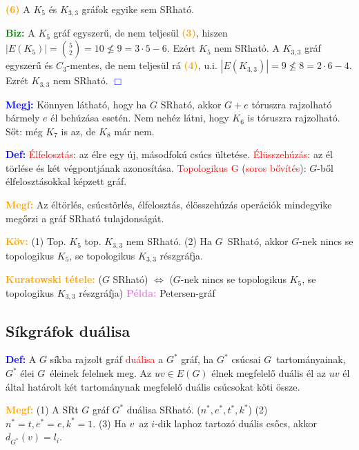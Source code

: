 \documentclass[../szamtud.tex]{subfiles}
\begin{document}
        \textcolor{orange}{\textbf{(6)}} A $K_5$ és $K_{3,3}$ gráfok egyike sem SRható.

        \textcolor{green}{\textbf{Biz:}} A $K_5$ gráf egyszerű, de nem teljesül \textcolor{orange}{\textbf{(3)}}, hiszen $|E(K_5)| = \binom{5}{2} = 10 \nleq 9 = 3 \cdot 5 - 6$. Ezért $K_5$ nem SRható. A $K_{3,3}$ gráf egyszerű és $C_3$-mentes, de nem teljesül rá \textcolor{orange}{\textbf{(4)}}, u.i. $|E(K_{3,3})| = 9 \nleq 8 = 2 \cdot 6 - 4$. Ezrét $K_{3,3}$ nem SRható. \textcolor{blue}{$\Box$}

        \textcolor{blue}{\textbf{Megj:}} Könnyen látható, hogy ha $G$ SRható, akkor $G + e$ tóruszra rajzolható bármely $e$ él behúzása esetén. Nem nehéz látni, hogy $K_6$ is tóruszra rajzolható. Sőt: még $K_7$ is az, de $K_8$ már nem. 

        \textcolor{blue}{\textbf{Def:}} \textcolor{red}{Élfelosztás}: az élre egy új, másodfokú csúcs ültetése. \textcolor{red}{Élüsszehúzás}: az él törlése és két végpontjának azonosítása. \textcolor{red}{Topologikus G} (\textcolor{red}{soros bővítés}): $G$-ből élfelosztásokkal képzett gráf. 

        \textcolor{orange}{\textbf{Megf:}} Az éltörlés, csúcstörlés, élfelosztás, élösszehúzás operációk mindegyike megőrzi a gráf SRható tulajdonságát. 

        \textcolor{orange}{\textbf{Köv:}} (1) Top. $K_5$ top. $K_{3,3}$ nem SRható. (2) Ha $G$ SRható, akkor $G$-nek nincs se topologikus $K_5$, se topologikus $K_{3,3}$ részgráfja.

        \textcolor{orange}{\textbf{Kuratowski tétele:}} ($G$ SRható) $\Longleftrightarrow$ ($G$-nek nincs se topologikus $K_5$, se topologikus $K_{3,3}$ részgráfja) \textcolor{violet}{\textbf{Példa:}} Petersen-gráf

    \subsection{Síkgráfok duálisa}

        \textcolor{blue}{\textbf{Def:}} A $G$ síkba rajzolt gráf \textcolor{red}{duálisa} a $G^*$ gráf, ha $G^*$ csúcsai $G$ tartományainak, $G^*$ élei $G$ éleinek felelnek meg. Az $uv \in E(G)$ élnek megfelelő duális él az $uv$ él által határolt két tartománynak megfelelő duális csúcsokat köti össze. 

        \textcolor{orange}{\textbf{Megf:}} (1) A SRt $G$ gráf $G^*$ duálisa SRható. ($n^*, e^*, t^*, k^*$) (2) $n^* = t, e^* = e, k^* = 1$. (3) Ha $v$ az $i$-dik laphoz tartozó duális csőcs, akkor $d_{G^*}(v) = l_i$.
\end{document}
